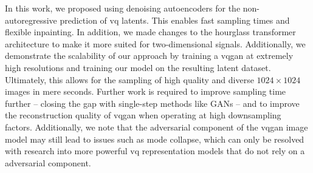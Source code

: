In this work, we proposed using denoising autoencoders for the
non-autoregressive prediction of \acrshort{vq} latents. This enables fast
sampling times and flexible inpainting. In addition, we made changes to the
hourglass transformer architecture to make it more suited for two-dimensional
signals. Additionally, we demonstrate the scalability of our approach by
training a \gls{vqgan} at extremely high resolutions and training our model on
the resulting latent dataset. Ultimately, this allows for the sampling of high
quality and diverse $1024 \times 1024$ images in mere seconds. Further work is
required to improve sampling time further -- closing the gap with single-step
methods like GANs -- and to improve the reconstruction quality of \gls{vqgan}
when operating at high downsampling factors. Additionally, we note that the
adversarial component of the \gls{vqgan} image model may still lead to issues
such as mode collapse, which can only be resolved with research into more
powerful \acrshort{vq} representation models that do not rely on a adversarial
component.
